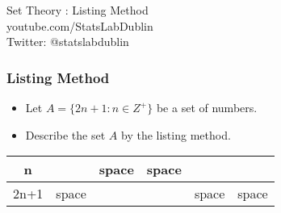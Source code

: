 \documentclass{beamer}
\begin{document}
\begin{frame}
\begin{center}
{ \Huge
Set Theory : Listing Method }
\\
\bigskip
{ \Large
youtube.com/StatsLabDublin \\ \vspace{0.2cm} Twitter: @statslabdublin
}
\end{center}
\end{frame}

\begin{frame}

\frametitle{Listing Method}
\Large
\vspace{-3cm}
\begin{itemize}
\item Let $A = \{2n+1 : n \in Z^{+}\}$ be a set of numbers.
\item Describe the set $A$ by the listing method.
\end{itemize} 
\begin{center}
\begin{tabular}{|c|c|c|c|c|c|}
\hline n &  &{\color{white} space}  & {\color{white} space} &  &  \\ 
\hline 2n+1 &{\color{white} space}  &  &  & {\color{white} space} &{\color{white} space}  \\ 
\hline 
\end{tabular} 
\end{center}
\end{frame}
\begin{frame}



\end{frame}
\end{document}
